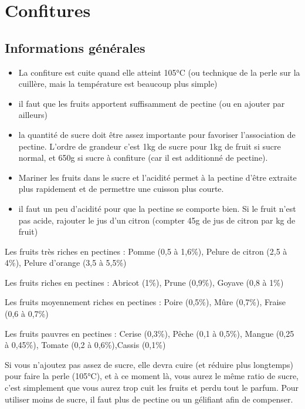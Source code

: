 \documentclass[a4paper,twoside,openright]{report}
\begin{document}
\chapter{Confitures}
\minitoc

\section{Informations générales}
\begin{itemize}
\item La confiture est cuite quand elle atteint 105°C (ou technique de la perle sur la cuillère, mais la température est beaucoup plus simple)
\item il faut que les fruits apportent suffisamment de pectine (ou en ajouter par ailleurs)
\item la quantité de sucre doit être assez importante pour favoriser l'association de pectine. L'ordre de grandeur c'est 1kg de sucre pour 1kg de fruit si sucre normal, et 650g si sucre à confiture (car il est additionné de pectine). 
\item Mariner les fruits dans le sucre et l'acidité permet à la pectine d'être extraite plus rapidement et de permettre une cuisson plus courte.
\item il faut un peu d'acidité pour que la pectine se comporte bien. Si le fruit n'est pas acide, rajouter le jus d'un citron (compter 45g de jus de citron par kg de fruit)
\end{itemize}

Les fruits très riches en pectines : Pomme (0,5 à 1,6\%), Pelure de citron (2,5 à 4\%), Pelure d'orange (3,5 à 5,5\%)

Les fruits riches en pectines : Abricot (1\%), Prune (0,9\%), Goyave (0,8 à 1\%)

Les fruits moyennement riches en pectines : Poire (0,5\%), Mûre (0,7\%), Fraise (0,6 à 0,7\%)

Les fruits pauvres en pectines : Cerise (0,3\%), Pêche (0,1 à 0,5\%), Mangue (0,25 à 0,45\%), Tomate (0,2 à 0,6\%),Cassis (0,1\%)

\begin{remarque}
Si vous n'ajoutez pas assez de sucre, elle devra cuire (et réduire plus longtemps) pour faire la perle (105°C), et à ce moment là, vous aurez le même ratio de sucre, c'est simplement que vous aurez trop cuit les fruits et perdu tout le parfum. Pour utiliser moins de sucre, il faut plus de pectine ou un gélifiant afin de compenser.
\end{remarque}
\end{document}

